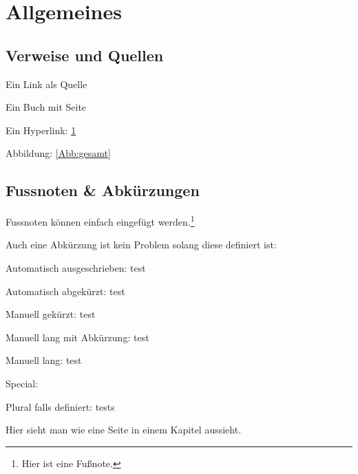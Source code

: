 \chapter{Allgemeines}
\label{ch:VuQ}

\section{Verweise und Quellen}

Ein Link als Quelle\autocite{link}

Ein Buch mit Seite\cite[12]{book}

Ein Hyperlink: \ref{ch:VuQ}

Abbildung: \ref{Abb:gesamt}

\section{Fussnoten \& Abkürzungen}

Fussnoten können einfach eingefügt werden.\footnote{Hier ist eine Fußnote.}

Auch eine Abkürzung ist kein Problem solang diese definiert ist:

Automatisch ausgeschrieben: \ac{test}

Automatisch abgekürzt: \ac{test}

Manuell gekürzt:  \acs{test}

Manuell lang mit Abkürzung: \acf{test}

Manuell lang: \acl{test}

Special: 

Plural falls definiert: \acp{test}


\newpage



Hier sieht man wie eine Seite in einem Kapitel aussieht.	 

